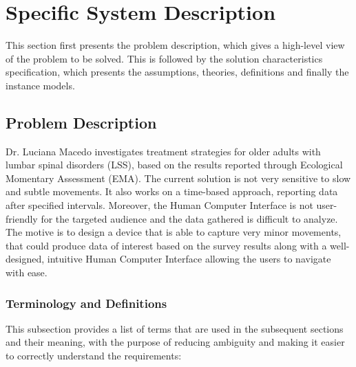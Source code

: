 \documentclass[12pt]{article}
\begin{document}
\section{Specific System Description}

This section first presents the problem description, which gives a high-level
view of the problem to be solved.  This is followed by the solution characteristics
specification, which presents the assumptions, theories, definitions and finally
the instance models.  

\subsection{Problem Description} \label{Sec_pd}

Dr. Luciana Macedo investigates treatment strategies for older adults with lumbar spinal disorders (LSS), based on the results reported through Ecological Momentary Assessment (EMA).
The current solution is not very sensitive to slow and subtle movements. It also works on a time-based approach, reporting data after specified intervals. Moreover, the Human Computer Interface is not user-friendly for the targeted audience and the data gathered is difficult to analyze.
The motive is to design a device that is able to capture very minor movements, that could produce data of interest based on the survey results along with a well-designed, intuitive Human Computer Interface allowing the users to navigate with ease.

\subsubsection{Terminology and  Definitions}

This subsection provides a list of terms that are used in the subsequent
sections and their meaning, with the purpose of reducing ambiguity and making it
easier to correctly understand the requirements:
\end{document}
